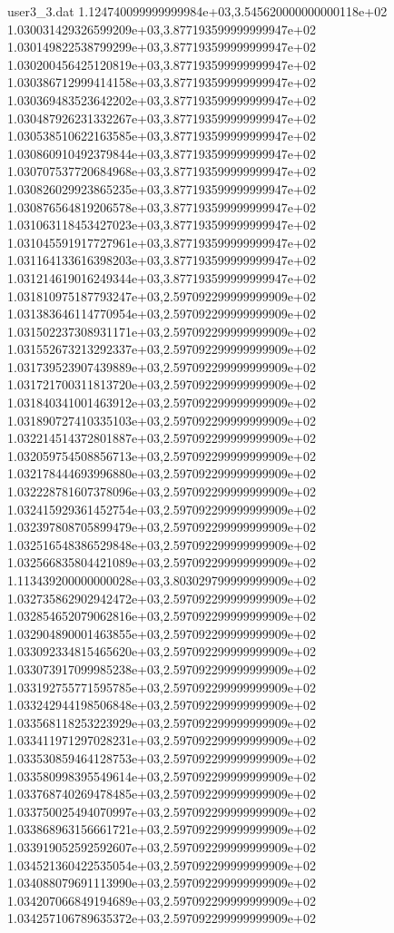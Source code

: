 \begin{filecontents}{user3_3.dat}
1.124740099999999984e+03,3.545620000000000118e+02
1.030031429326599209e+03,3.877193599999999947e+02
1.030149822538799299e+03,3.877193599999999947e+02
1.030200456425120819e+03,3.877193599999999947e+02
1.030386712999414158e+03,3.877193599999999947e+02
1.030369483523642202e+03,3.877193599999999947e+02
1.030487926231332267e+03,3.877193599999999947e+02
1.030538510622163585e+03,3.877193599999999947e+02
1.030860910492379844e+03,3.877193599999999947e+02
1.030707537720684968e+03,3.877193599999999947e+02
1.030826029923865235e+03,3.877193599999999947e+02
1.030876564819206578e+03,3.877193599999999947e+02
1.031063118453427023e+03,3.877193599999999947e+02
1.031045591917727961e+03,3.877193599999999947e+02
1.031164133616398203e+03,3.877193599999999947e+02
1.031214619016249344e+03,3.877193599999999947e+02
1.031810975187793247e+03,2.597092299999999909e+02
1.031383646114770954e+03,2.597092299999999909e+02
1.031502237308931171e+03,2.597092299999999909e+02
1.031552673213292337e+03,2.597092299999999909e+02
1.031739523907439889e+03,2.597092299999999909e+02
1.031721700311813720e+03,2.597092299999999909e+02
1.031840341001463912e+03,2.597092299999999909e+02
1.031890727410335103e+03,2.597092299999999909e+02
1.032214514372801887e+03,2.597092299999999909e+02
1.032059754508856713e+03,2.597092299999999909e+02
1.032178444693996880e+03,2.597092299999999909e+02
1.032228781607378096e+03,2.597092299999999909e+02
1.032415929361452754e+03,2.597092299999999909e+02
1.032397808705899479e+03,2.597092299999999909e+02
1.032516548386529848e+03,2.597092299999999909e+02
1.032566835804421089e+03,2.597092299999999909e+02
1.113439200000000028e+03,3.803029799999999909e+02
1.032735862902942472e+03,2.597092299999999909e+02
1.032854652079062816e+03,2.597092299999999909e+02
1.032904890001463855e+03,2.597092299999999909e+02
1.033092334815465620e+03,2.597092299999999909e+02
1.033073917099985238e+03,2.597092299999999909e+02
1.033192755771595785e+03,2.597092299999999909e+02
1.033242944198506848e+03,2.597092299999999909e+02
1.033568118253223929e+03,2.597092299999999909e+02
1.033411971297028231e+03,2.597092299999999909e+02
1.033530859464128753e+03,2.597092299999999909e+02
1.033580998395549614e+03,2.597092299999999909e+02
1.033768740269478485e+03,2.597092299999999909e+02
1.033750025494070997e+03,2.597092299999999909e+02
1.033868963156661721e+03,2.597092299999999909e+02
1.033919052592592607e+03,2.597092299999999909e+02
1.034521360422535054e+03,2.597092299999999909e+02
1.034088079691113990e+03,2.597092299999999909e+02
1.034207066849194689e+03,2.597092299999999909e+02
1.034257106789635372e+03,2.597092299999999909e+02

\end{filecontents}
